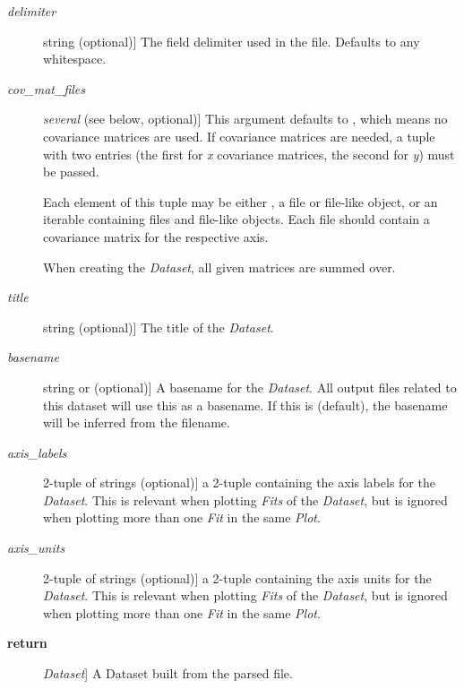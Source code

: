 \documentclass[a4paper,10pt,english]{sphinxmanual}
\begin{document}
\begin{fulllineitems}
\begin{description}
\item[{\emph{delimiter}}] \leavevmode{[}string (optional){]}
The field delimiter used in the file. Defaults to any whitespace.

\item[{\emph{cov\_mat\_files}}] \leavevmode{[}\emph{several} (see below, optional){]}
This argument defaults to , which means no covariance matrices
are used. If covariance matrices are needed, a tuple with two entries
(the first for \emph{x} covariance matrices, the second for \emph{y}) must be
passed.

Each element of this tuple may be either , a file or file-like
object, or an iterable containing files and file-like objects. Each
file should contain a covariance matrix for the respective axis.

When creating the \emph{Dataset}, all given matrices are summed over.

\item[{\emph{title}}] \leavevmode{[}string (optional){]}
The title of the \emph{Dataset}.

\item[{\emph{basename}}] \leavevmode{[}string or  (optional){]}
A basename for the \emph{Dataset}. All output files related to this dataset
will use this as a basename. If this is  (default), the
basename will be inferred from the filename.

\item[{\emph{axis\_labels}}] \leavevmode{[}2-tuple of strings (optional){]}
a 2-tuple containing the axis labels for the \emph{Dataset}. This is
relevant when plotting \emph{Fits} of the \emph{Dataset}, but is ignored when
plotting more than one \emph{Fit} in the same \emph{Plot}.

\item[{\emph{axis\_units}}] \leavevmode{[}2-tuple of strings (optional){]}
a 2-tuple containing the axis units for the \emph{Dataset}. This is
relevant when plotting \emph{Fits} of the \emph{Dataset}, but is ignored when
plotting more than one \emph{Fit} in the same \emph{Plot}.

\item[{\textbf{return}}] \leavevmode{[}\emph{Dataset}{]}
A Dataset built from the parsed file.

\end{description}

\end{fulllineitems}

\end{document}
